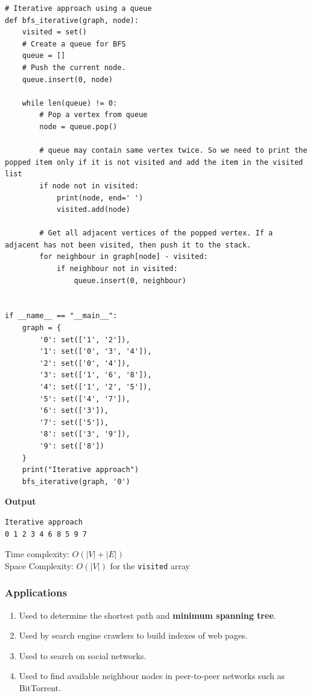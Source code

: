 \documentclass[a4paper,11pt]{book}
\begin{document}
\begin{lstlisting}
# Iterative approach using a queue
def bfs_iterative(graph, node):
    visited = set()
    # Create a queue for BFS
    queue = []
    # Push the current node.
    queue.insert(0, node)

    while len(queue) != 0:
        # Pop a vertex from queue
        node = queue.pop()

        # queue may contain same vertex twice. So we need to print the popped item only if it is not visited and add the item in the visited list
        if node not in visited:
            print(node, end=' ')
            visited.add(node)
            
        # Get all adjacent vertices of the popped vertex. If a adjacent has not been visited, then push it to the stack.
        for neighbour in graph[node] - visited:
            if neighbour not in visited:
                queue.insert(0, neighbour)
                
                
if __name__ == "__main__":
    graph = {
        '0': set(['1', '2']),
        '1': set(['0', '3', '4']),
        '2': set(['0', '4']),
        '3': set(['1', '6', '8']),
        '4': set(['1', '2', '5']),
        '5': set(['4', '7']),
        '6': set(['3']),
        '7': set(['5']),
        '8': set(['3', '9']),
        '9': set(['8'])
    }
    print("Iterative approach")
    bfs_iterative(graph, '0')
\end{lstlisting}
\textbf{Output}
\begin{lstlisting}
Iterative approach
0 1 2 3 4 6 8 5 9 7
\end{lstlisting}
\noindent Time complexity: $O(|V| + |E|)$\\
\noindent Space Complexity: $O(|V|)$ for the \lstinline{visited} array

\subsubsection{Applications}

\begin{enumerate}
    \item Used to determine the shortest path and \textbf{minimum spanning tree}.
\item Used by search engine crawlers to build indexes of web pages.
\item Used to search on social networks.
\item Used to find available neighbour nodes in peer-to-peer networks such as BitTorrent.
\end{enumerate}
\end{document}
